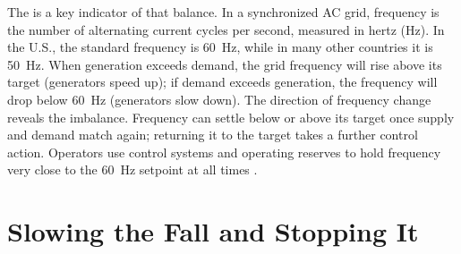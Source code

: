 The  is a key indicator of that balance. In a synchronized AC grid, frequency is the number of alternating current cycles per second, measured in hertz (Hz). In the U.S., the standard frequency is 60~Hz, while in many other countries it is 50~Hz. When generation exceeds demand, the grid frequency will rise above its target (generators speed up); if demand exceeds generation, the frequency will drop below 60~Hz (generators slow down). The direction of frequency change reveals the imbalance. Frequency can settle below or above its target once supply and demand match again; returning it to the target takes a further control action. Operators use control systems and operating reserves to hold frequency very close to the 60~Hz setpoint at all times \autocite{NERCBalancingFrequency2021}.

\section{Slowing the Fall and Stopping It}
\label{sec:inertia}

